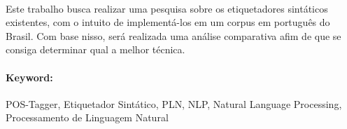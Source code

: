 \paragraph{}Este trabalho busca realizar uma pesquisa sobre os etiquetadores sintáticos existentes, com o intuito de implementá-los em um corpus em português do Brasil. Com base nisso, será realizada uma análise comparativa afim de que se consiga determinar qual a melhor técnica.

\paragraph{Keyword:}POS-Tagger, Etiquetador Sintático, PLN, NLP, Natural Language Processing, Processamento de Linguagem Natural